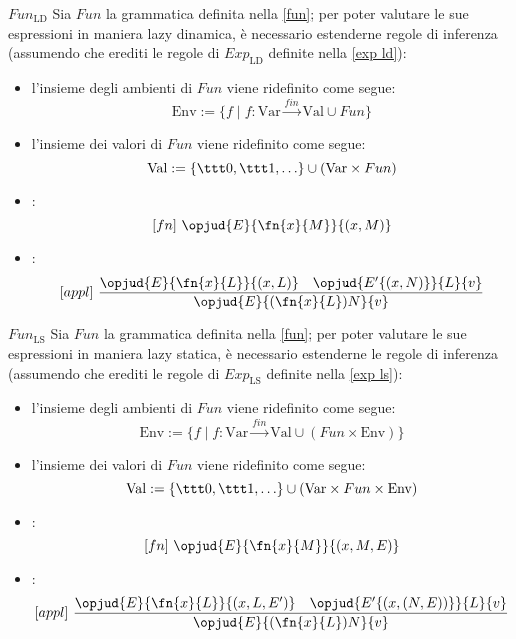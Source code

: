 \documentclass[a4paper, 12pt]{report}
\begin{document}
    \begin{framedprop}[breakable]{$Fun_\mathrm{LD}$}
        Sia $Fun$ la grammatica definita nella \cref{fun}; per poter valutare le sue espressioni in maniera lazy dinamica, è necessario estenderne regole di inferenza (assumendo che erediti le regole di $Exp_\mathrm{LD}$ definite nella \cref{exp ld}):

        \begin{itemize}
            \item l'insieme degli ambienti di $Fun$ viene ridefinito come segue: $$\mathrm{Env} := \{ f \mid f: \mathrm{Var} \xrightarrow{fin} \mathrm{Val} \cup Fun \}$$
            \item l'insieme dei valori di $Fun$ viene ridefinito come segue: $$\mathrm{Val} := \{ \ttt 0, \ttt 1, \ldots \} \cup (\mathrm{Var} \times Fun)$$
            \item {}: $$[fn] \ \opjud{E}{\fn{x}{M}}{(x,M)}$$
            \item {}: $$[appl] \ \dfrac{\opjud{E}{\fn{x}{L}}{(x,L)} \quad \opjud{E'\{(x,N)\}}{L}{v}}{\opjud{E}{(\fn{x}{L})N}{v}}$$
        \end{itemize}
    \end{framedprop}

    \begin{framedprop}{$Fun_\mathrm{LS}$}
        Sia $Fun$ la grammatica definita nella \cref{fun}; per poter valutare le sue espressioni in maniera lazy statica, è necessario estenderne le regole di inferenza (assumendo che erediti le regole di $Exp_\mathrm{LS}$ definite nella \cref{exp ls}):

        \begin{itemize}
            \item l'insieme degli ambienti di $Fun$ viene ridefinito come segue: $$\mathrm{Env} := \{f \mid f :\mathrm{Var} \xrightarrow{fin} \mathrm{Val} \cup (Fun \times \mathrm{Env})\}$$
            \item l'insieme dei valori di $Fun$ viene ridefinito come segue: $$\mathrm{Val} := \{\ttt 0, \ttt 1, \ldots\} \cup (\mathrm{Var} \times Fun \times \mathrm{Env})$$
            \item {}: $$[fn] \ \opjud{E}{\fn{x}{M}}{(x,M,E)}$$
            \item {}: $$[appl] \ \dfrac{\opjud{E}{\fn{x}{L}}{(x,L,E')} \quad \opjud{E'\{(x,(N,E))\}}{L}{v}}{\opjud{E}{(\fn{x}{L})N}{v}}$$
        \end{itemize}
    \end{framedprop}
\end{document}
